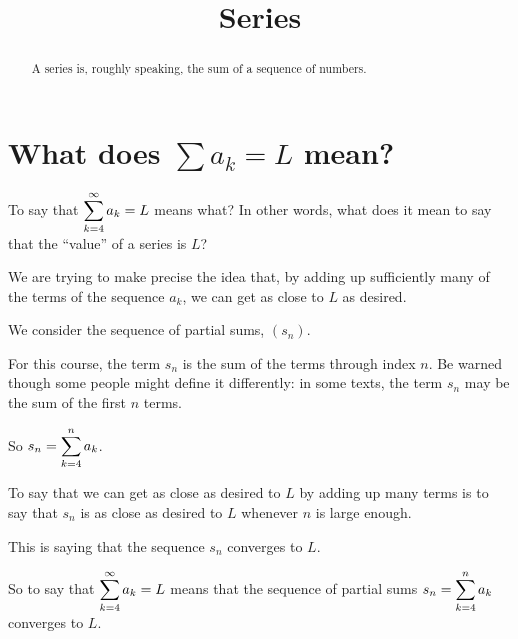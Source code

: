 \documentclass{ximera}
\title{Series}
\begin{document}
\begin{abstract}
  A series is, roughly speaking, the sum of a sequence of numbers.
\end{abstract}

\maketitle

\section{What does $\displaystyle\sum a_k = L$ mean?}

\begin{question}
  To say that \(\displaystyle\displaystyle\sum_{k=4}^\infty a_k = L\) means what?  In other words, what does it mean to say that the ``value'' of a series is \(L\)?
  \begin{solution}
    \begin{hint}
      We are trying to make precise the idea that, by adding up sufficiently many of the terms of the sequence \(a_k\), we can get as close to \(L\) as desired.
    \end{hint}
    \begin{hint}
      We consider the sequence of partial sums, \((s_n)\).
    \end{hint}
    \begin{hint}
      For this course, the term \(s_n\) is the sum of the terms through index \(n\).  Be warned though some people might define it differently: in some texts, the term \(s_n\) may be the sum of the first \(n\) terms.
    \end{hint}
    \begin{hint}
      So \(s_n = \displaystyle\displaystyle\sum_{k=4}^n a_k\).
    \end{hint}
    \begin{hint}
      To say that we can get as close as desired to \(L\) by adding up many terms is to say that \(s_n\) is as close as desired to \(L\) whenever \(n\) is large enough.
    \end{hint}
    \begin{hint}
      This is saying that the sequence \(s_n\) converges to \(L\).
    \end{hint}
    \begin{hint}
      So to say that \(\displaystyle\displaystyle\sum_{k=4}^\infty a_k = L\) means that the sequence of partial sums \(s_n = \displaystyle\displaystyle\sum_{k=4}^n a_k \) converges to \(L\).
      

\end{hint}
\end{solution}
\end{question}
\end{document}
